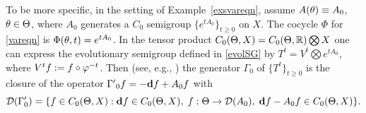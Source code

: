 \begin{exmp}
To be more specific, in the setting of Example~\ref{exsvareqn},
assume $A(\theta)\equiv A_0$, $\theta\in \Theta$, where $A_0$  generates a
$C_0$ semigroup $\{e^{tA_0}\}_{t\ge 0}$ on $X$. The cocycle $\Phi$ for
\eqref{vareqn} is $\Phi(\theta,t)=e^{tA_0}$. In the tensor product
$C_0(\Theta,X)=C_0(\Theta,{\Bbb{R}})\bigotimes X$ one can express the
evolutionary semigroup  defined in \eqref{evolSG} by
$T^t=V^t\bigotimes e^{tA_0}$, where $V^tf:=f\circ \varphi^{-t}$. Then
(see, e.g., \cite[p.~23]{Nag}) the generator $\Gamma_0$ of
$\{T^t\}_{t\ge 0}$ is the closure of the operator
${\Gamma'}_0 f  =
-\text{{\bf d}} f+A_0f$ with
\begin{equation}\notag
{\cal{D}}(\Gamma'_0)  =
\{f\in C_0(\Theta,X):\text{{\bf d}} f\in C_0(\Theta,X),\; f:\Theta\to {\cal{D}}(A_0), \;\text{{\bf d}} f-A_0f\in C_0(\Theta,X)\}.
\end{equation}
\end{exmp}

